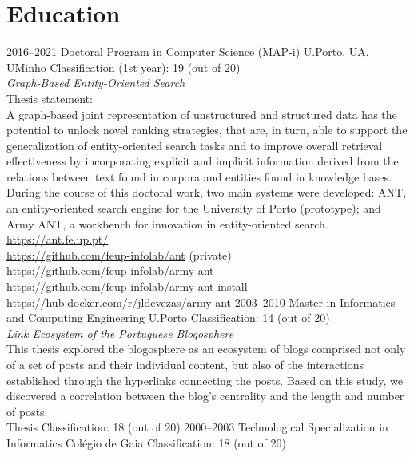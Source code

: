 \documentclass{friggeri-cv}
\begin{document}

\section{Education}

\begin{entrylist}
\entry
{2016--2021}
{Doctoral Program {\normalfont in Computer Science (MAP-i)}}
{U.Porto, UA, UMinho}
{Classification (1st year): 19 (out of 20)\\[.5ex]
\emph{Graph-Based Entity-Oriented Search}\\[.5ex]
Thesis statement:\\
A graph-based joint representation of unstructured and structured data has the potential to unlock novel ranking strategies, that are, in turn, able to support the generalization of entity-oriented search tasks and to improve overall retrieval effectiveness by incorporating explicit and implicit information derived from the relations between text found in corpora and entities found in knowledge bases.\\[-.75em]

During the course of this doctoral work, two main systems were developed: ANT, an entity-oriented search engine for the University of Porto (prototype); and Army ANT, a workbench for innovation in entity-oriented search.\\[-.75em]

\url{https://ant.fe.up.pt/}\\
\url{https://github.com/feup-infolab/ant} (private)\\[-.75em]

\url{https://github.com/feup-infolab/army-ant}\\
\url{https://github.com/feup-infolab/army-ant-install}\\
\url{https://hub.docker.com/r/jldevezas/army-ant}}
\entry
{2003--2010}
{Master {\normalfont in Informatics and Computing Engineering}}
{U.Porto}
{Classification: 14 (out of 20)\\[.5ex]
\emph{Link Ecosystem of the Portuguese Blogosphere}\\[.5ex]
This thesis explored the blogosphere as an ecosystem of blogs comprised not only of a set of posts and their
individual content, but also of the interactions established through the hyperlinks connecting the posts. Based on
this study, we discovered a correlation between the blog's centrality and the length and number of posts.\\[.5ex]
Thesis Classification: 18 (out of 20)}
\entry
{2000--2003}
{Technological Specialization {\normalfont in Informatics}}
{Colégio de Gaia}
{Classification: 18 (out of 20)}
\end{entrylist}
\end{document}
